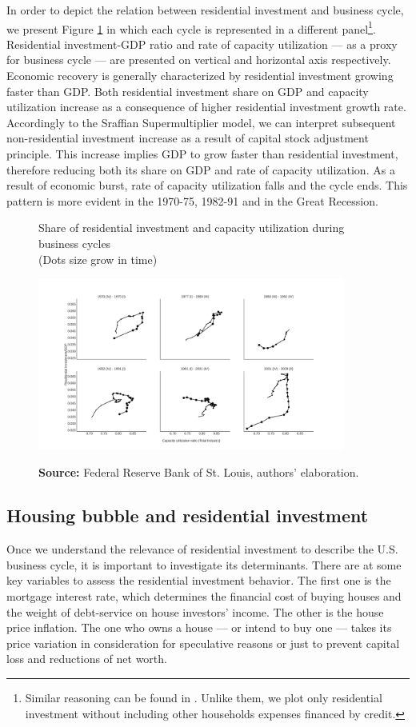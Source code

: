 \documentclass[12pt, a4]{article}
\begin{document}
In order to depict the relation between residential investment and business cycle, we present Figure \ref{fig:cycles} in which each cycle is represented in a different panel\footnote{Similar reasoning can be found in \textcite{fiebiger_trend_2017}. Unlike them, we plot only residential investment without including other households expenses financed by credit.}.
Residential investment-GDP ratio and rate of capacity utilization --- as a proxy for business cycle --- are presented on vertical and horizontal axis respectively.
Economic recovery is generally characterized by residential investment growing faster than GDP. Both residential investment share on GDP and capacity utilization increase as a consequence of higher residential investment growth rate.
Accordingly to the Sraffian Supermultiplier model, we can interpret subsequent non-residential investment increase as a result of capital stock adjustment principle. 
This increase implies GDP to grow faster than residential investment, therefore reducing both its share on GDP and rate of capacity utilization.
As a result of economic burst, rate of capacity utilization falls and the cycle ends.
This pattern is more evident in the 1970-75, 1982-91 and in the Great Recession.


\begin{figure}[htb]
    \centering
        \caption{Share of residential investment and capacity utilization during business cycles\\\centering (Dots size grow in  time)} 
    \includegraphics[width = 0.9\textwidth]{./figs/cycles.png}
    \label{fig:cycles}
    \caption*{\textbf{Source:} Federal Reserve Bank of St. Louis, authors’ elaboration.}
\end{figure}

\subsection{Housing bubble and residential investment}
\label{sec:org635390f}
\label{sec_own}
Once we understand the relevance of residential investment to describe the U.S. business cycle, it is important to investigate its determinants.
There are at some key variables to assess the residential investment behavior.
The first one is the mortgage interest rate, which determines the financial cost of buying houses and the weight of debt-service on house investors' income.
The other is the house price inflation.
The one who owns a house --- or intend to buy one --- takes its price variation in consideration for speculative reasons or just to prevent capital loss and reductions of net worth.
\end{document}
